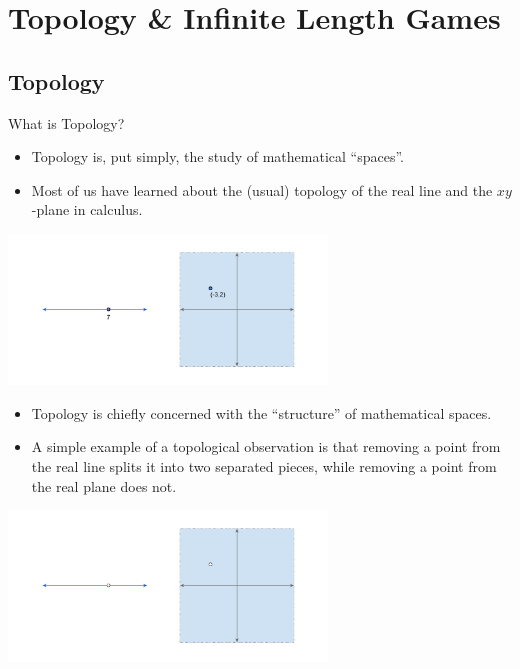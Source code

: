 \documentclass{beamer}
\begin{document}
\section{Topology \& Infinite Length Games}

\subsection{Topology}

\begin{frame}{What is Topology?}

  \begin{itemize}
  \item
    Topology is, put simply, the study of mathematical ``spaces''.
  \pause
  \item
    Most of us have learned about the (usual) topology of the real line and the $xy$-plane in calculus.
  \end{itemize}
  \begin{center}
    \includegraphics[height=4cm]{images/r_r2}
  \end{center}
\end{frame}
\begin{frame}
  \begin{itemize}
  \item
    Topology is chiefly concerned with the ``structure'' of mathematical spaces.
  \pause
  \item
    A simple example of a topological observation is that removing a point from the real line splits it into two separated pieces, while removing a point from the real plane does not.
  \end{itemize}
  \begin{center}
    \includegraphics[height=4cm]{images/r_r2_missing_point}
  \end{center}
\end{frame}
\end{document}
